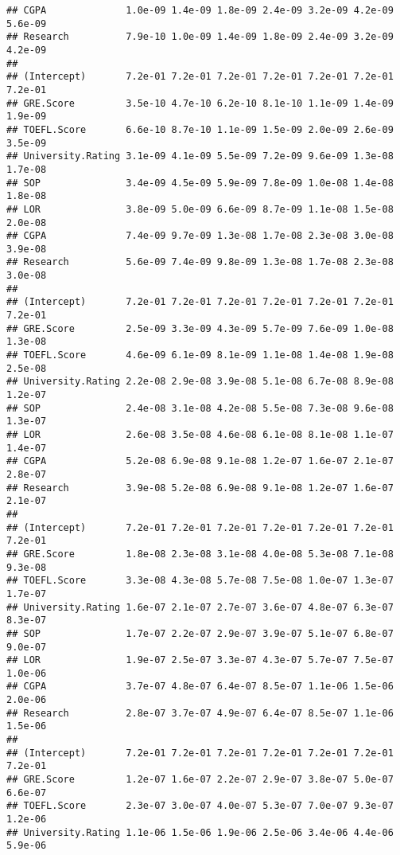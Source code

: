 \documentclass[
]{article}
\begin{document}
\begin{verbatim}
## CGPA              1.0e-09 1.4e-09 1.8e-09 2.4e-09 3.2e-09 4.2e-09 5.6e-09
## Research          7.9e-10 1.0e-09 1.4e-09 1.8e-09 2.4e-09 3.2e-09 4.2e-09
##                                                                          
## (Intercept)       7.2e-01 7.2e-01 7.2e-01 7.2e-01 7.2e-01 7.2e-01 7.2e-01
## GRE.Score         3.5e-10 4.7e-10 6.2e-10 8.1e-10 1.1e-09 1.4e-09 1.9e-09
## TOEFL.Score       6.6e-10 8.7e-10 1.1e-09 1.5e-09 2.0e-09 2.6e-09 3.5e-09
## University.Rating 3.1e-09 4.1e-09 5.5e-09 7.2e-09 9.6e-09 1.3e-08 1.7e-08
## SOP               3.4e-09 4.5e-09 5.9e-09 7.8e-09 1.0e-08 1.4e-08 1.8e-08
## LOR               3.8e-09 5.0e-09 6.6e-09 8.7e-09 1.1e-08 1.5e-08 2.0e-08
## CGPA              7.4e-09 9.7e-09 1.3e-08 1.7e-08 2.3e-08 3.0e-08 3.9e-08
## Research          5.6e-09 7.4e-09 9.8e-09 1.3e-08 1.7e-08 2.3e-08 3.0e-08
##                                                                          
## (Intercept)       7.2e-01 7.2e-01 7.2e-01 7.2e-01 7.2e-01 7.2e-01 7.2e-01
## GRE.Score         2.5e-09 3.3e-09 4.3e-09 5.7e-09 7.6e-09 1.0e-08 1.3e-08
## TOEFL.Score       4.6e-09 6.1e-09 8.1e-09 1.1e-08 1.4e-08 1.9e-08 2.5e-08
## University.Rating 2.2e-08 2.9e-08 3.9e-08 5.1e-08 6.7e-08 8.9e-08 1.2e-07
## SOP               2.4e-08 3.1e-08 4.2e-08 5.5e-08 7.3e-08 9.6e-08 1.3e-07
## LOR               2.6e-08 3.5e-08 4.6e-08 6.1e-08 8.1e-08 1.1e-07 1.4e-07
## CGPA              5.2e-08 6.9e-08 9.1e-08 1.2e-07 1.6e-07 2.1e-07 2.8e-07
## Research          3.9e-08 5.2e-08 6.9e-08 9.1e-08 1.2e-07 1.6e-07 2.1e-07
##                                                                          
## (Intercept)       7.2e-01 7.2e-01 7.2e-01 7.2e-01 7.2e-01 7.2e-01 7.2e-01
## GRE.Score         1.8e-08 2.3e-08 3.1e-08 4.0e-08 5.3e-08 7.1e-08 9.3e-08
## TOEFL.Score       3.3e-08 4.3e-08 5.7e-08 7.5e-08 1.0e-07 1.3e-07 1.7e-07
## University.Rating 1.6e-07 2.1e-07 2.7e-07 3.6e-07 4.8e-07 6.3e-07 8.3e-07
## SOP               1.7e-07 2.2e-07 2.9e-07 3.9e-07 5.1e-07 6.8e-07 9.0e-07
## LOR               1.9e-07 2.5e-07 3.3e-07 4.3e-07 5.7e-07 7.5e-07 1.0e-06
## CGPA              3.7e-07 4.8e-07 6.4e-07 8.5e-07 1.1e-06 1.5e-06 2.0e-06
## Research          2.8e-07 3.7e-07 4.9e-07 6.4e-07 8.5e-07 1.1e-06 1.5e-06
##                                                                          
## (Intercept)       7.2e-01 7.2e-01 7.2e-01 7.2e-01 7.2e-01 7.2e-01 7.2e-01
## GRE.Score         1.2e-07 1.6e-07 2.2e-07 2.9e-07 3.8e-07 5.0e-07 6.6e-07
## TOEFL.Score       2.3e-07 3.0e-07 4.0e-07 5.3e-07 7.0e-07 9.3e-07 1.2e-06
## University.Rating 1.1e-06 1.5e-06 1.9e-06 2.5e-06 3.4e-06 4.4e-06 5.9e-06

\end{verbatim}
\end{document}

